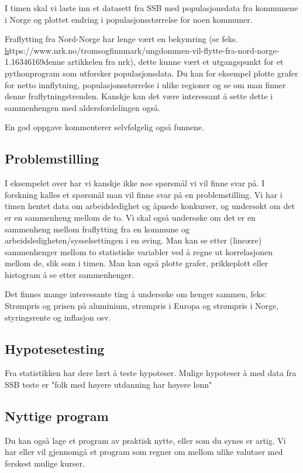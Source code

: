 \documentclass[12pt, titlepage]{article}
\begin{document}
I timen skal vi laste inn et datasett fra SSB med populasjonsdata fra kommunene i Norge og plottet endring i populasjonsstørrelse for noen kommuner.

Fraflytting fra Nord-Norge har lenge vært en bekymring (se feks. \href{}https://www.nrk.no/tromsogfinnmark/ungdommen-vil-flytte-fra-nord-norge-1.16346169{denne} artikkelen fra nrk),
dette kunne vært et utgangspunkt for et pythonprogram som utforsker populasjonsdata. Du kan for eksempel plotte grafer for netto innflytning, populasjonsstørrelse i ulike regioner og se om man finner denne fraflytningstrenden.
Kanskje kan det være interessant å sette dette i sammenhengen med aldersfordelingen også.

En god oppgave kommenterer selvfølgelig også funnene.

\subsection*{Problemstilling}

I eksempelet over har vi kanskje ikke noe spørsmål vi vil finne svar på. I forskning kalles et spørsmål man vil finne svar på en problemstilling. 
Vi har i timen hentet data om arbeidsledighet og åpnede konkurser, og undersøkt om det er en sammenheng mellom de to. Vi skal også undersøke om det er en sammenheng
mellom fraflytting fra en kommune og arbeidsledigheten/sysselsettingen i en øving.
Man kan se etter (lineære) sammenhenger mellom to statistiske variabler ved å regne ut korrelasjonen mellom de, slik som i timen. Man kan også plotte grafer, prikkeplott eller histogram
å se etter sammenhenger.

Det finnes mange interessante ting å undersøke om henger sammen, feks: Strømpris og prisen på aluminium, strømpris i Europa og strømpris i Norge, styringsrente og inflasjon osv.

\subsection*{Hypotesetesting}

Fra statistikken har dere lært å teste hypoteser. Mulige hypoteser å med data fra SSB teste er "folk med høyere utdanning har høyere lønn"

\subsection*{Nyttige program}

Du kan også lage et program av praktisk nytte, eller som du synes er artig. Vi har eller vil gjennomgå et program som regner om mellom ulike valutaer med ferskest mulige kurser.
\end{document}
